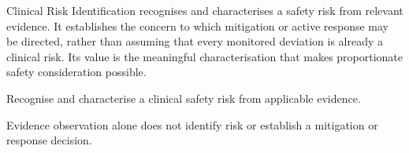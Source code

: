 Clinical Risk Identification recognises and characterises a safety risk from relevant evidence. It establishes the concern to which mitigation or active response may be directed, rather than assuming that every monitored deviation is already a clinical risk. Its value is the meaningful characterisation that makes proportionate safety consideration possible.



Recognise and characterise a clinical safety risk from applicable evidence.



Evidence observation alone does not identify risk or establish a mitigation or response decision.


